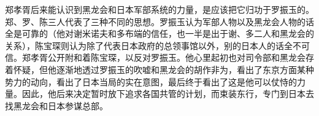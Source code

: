 郑孝胥后来能认识到黑龙会和日本军部系统的力量，是应该把它归功于罗振玉的。郑、罗、陈三人代表了三种不同的思想。罗振玉认为军部人物以及黑龙会人物的话全是可靠的（他对谢米诺夫和多布端的信任，也一半是出于谢、多二人和黑龙会的关系），陈宝琛则认为除了代表日本政府的总领事馆以外，别的日本人的话全不可信。郑孝胥公开附和着陈宝琛，以反对罗振玉。他心里起初也对司令部和黑龙会存着怀疑，但他逐渐地透过罗振玉的吹嘘和黑龙会的胡作非为，看出了东京方面某种势力的动向，看出了日本当局的实在意图，最后终于看出了这是他可以仗恃的力量。因此，他后来决定暂时放下追求各国共管的计划，而束装东行，专门到日本去找黑龙会和日本参谋总部。\\